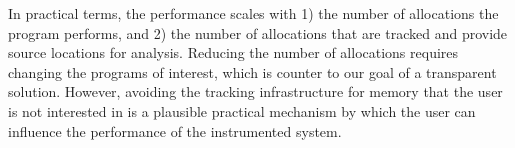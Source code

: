 In practical terms, the performance scales with 1) the number of
allocations the program performs, and 2) the number of allocations that
are tracked and provide source locations for analysis.  Reducing the
number of allocations requires changing the programs of interest, which
is counter to our goal of a transparent solution.  However, avoiding
the tracking infrastructure for memory that the user is not interested
in is a plausible practical mechanism by which the user can influence
the performance of the instrumented system.

%
%
%

